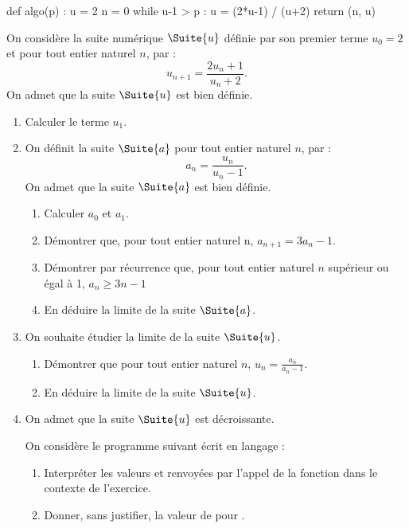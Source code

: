 
\begin{scontents}[overwrite,write-out=an2025j1exo2.py]
def algo(p) :
	u = 2
	n = 0
	while u-1 > p :
		u = (2*u-1) / (u+2)
	return (n, u)
\end{scontents}

On considère la suite numérique $\Suite{u}$ définie par son premier terme $u_{0}=2$ et pour tout entier naturel $n$, par : \[ u_{n+1}=\frac{2 u_{n}+1}{u_{n}+2}. \]
%
On admet que la suite $\Suite{u}$ est bien définie.

\begin{enumerate}
	\item Calculer le terme $u_{1}$.
	\item On définit la suite $\Suite{a}$ pour tout entier naturel $n$, par : \[ a_{n}=\frac{u_{n}}{u_{n}-1}. \]
	On admet que la suite $\Suite{a}$ est bien définie.
	\begin{enumerate}
		\item Calculer $a_{0}$ et $a_{1}$.
		\item Démontrer que, pour tout entier naturel n, $a_{n+1}=3 a_{n}-1$.
		\item Démontrer par récurrence que, pour tout entier naturel $n$ supérieur ou égal à 1, $a_{n} \geqslant 3 n-1$
		\item En déduire la limite de la suite $\Suite{a}$.
	\end{enumerate}
	\item On souhaite étudier la limite de la suite $\Suite{u}$.
	\begin{enumerate}
		\item Démontrer que pour tout entier naturel $n$, $u_{n}=\frac{a_{n}}{a_{n}-1}$.
		\item En déduire la limite de la suite $\Suite{u}$.
	\end{enumerate}
	\item On admet que la suite $\Suite{u}$ est décroissante.
	
	On considère le programme suivant écrit en langage  :
	
	\begin{enumerate}
		\item Interpréter les valeurs  et  renvoyées par l'appel de la fonction  dans le contexte de l'exercice.
		\item Donner, sans justifier, la valeur de  pour .
	\end{enumerate}
\end{enumerate}